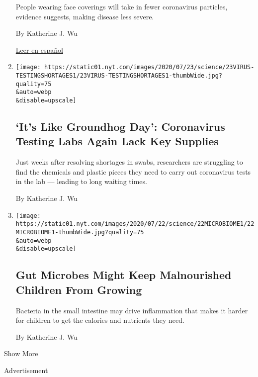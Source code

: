 \begin{enumerate}
  People wearing face coverings will take in fewer coronavirus
  particles, evidence suggests, making disease less severe.

  By Katherine J. Wu

  \href{https://www.nytimes.com/es/2020/07/29/espanol/ciencia-y-tecnologia/proteccion-cubrebocas-coronavirus.html}{Leer
  en español}
\item
  \href{/2020/07/23/health/coronavirus-testing-supply-shortage.html}{}

  \texttt{[image: https://static01.nyt.com/images/2020/07/23/science/23VIRUS-TESTINGSHORTAGES1/23VIRUS-TESTINGSHORTAGES1-thumbWide.jpg?quality=75\\\&auto=webp\\\&disable=upscale]}

  \hypertarget{its-like-groundhog-day-coronavirus-testing-labs-again-lack-key-supplies}{%
  \subsection{`It's Like Groundhog Day': Coronavirus Testing Labs Again
  Lack Key
  Supplies}\label{its-like-groundhog-day-coronavirus-testing-labs-again-lack-key-supplies}}

  Just weeks after resolving shortages in swabs, researchers are
  struggling to find the chemicals and plastic pieces they need to carry
  out coronavirus tests in the lab --- leading to long waiting times.

  By Katherine J. Wu
\item
  \href{/2020/07/22/health/microbiome-malnourishment-children.html}{}

  \texttt{[image: https://static01.nyt.com/images/2020/07/22/science/22MICROBIOME1/22MICROBIOME1-thumbWide.jpg?quality=75\\\&auto=webp\\\&disable=upscale]}

  \hypertarget{gut-microbes-might-keep-malnourished-children-from-growing}{%
  \subsection{Gut Microbes Might Keep Malnourished Children From
  Growing}\label{gut-microbes-might-keep-malnourished-children-from-growing}}

  Bacteria in the small intestine may drive inflammation that makes it
  harder for children to get the calories and nutrients they need.

  By Katherine J. Wu
\end{enumerate}

Show More

Advertisement

